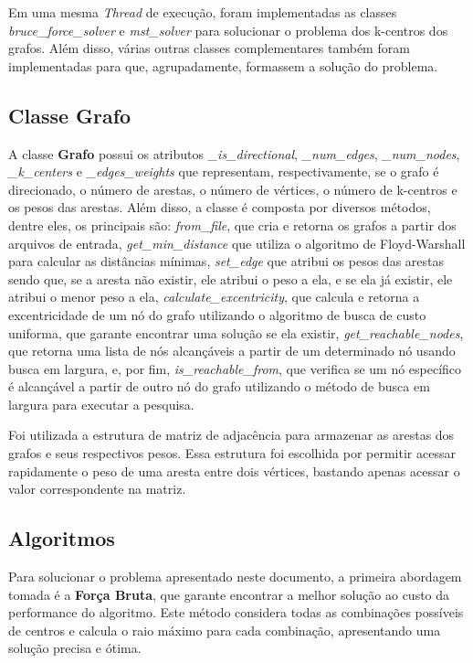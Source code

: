 Em uma mesma \textit{Thread} de execução, foram implementadas as classes \textit{bruce\_force\_solver} e \textit{mst\_solver} para solucionar o problema dos k-centros dos grafos. Além disso, várias outras classes complementares também foram implementadas para que, agrupadamente, formassem a solução do problema.  


\subsection{\esp Classe Grafo}
A classe \textbf{Grafo} possui os atributos \textit{\_is\_directional}, \textit{\_num\_edges}, \textit{\_num\_nodes}, \textit{\_k\_centers} e \textit{\_edges\_weights} que representam, respectivamente, se o grafo é direcionado, o número de arestas, o número de vértices, o número de k-centros e os pesos das arestas. Além disso, a classe é composta por diversos métodos, dentre eles, os principais são: \textit{from\_file}, que cria e retorna os grafos a partir dos arquivos de entrada, \textit{get\_min\_distance} que utiliza o algoritmo de Floyd-Warshall para calcular as distâncias mínimas, \textit{set\_edge} que atribui os pesos das arestas sendo que, se a aresta não existir, ele atribui o peso a ela, e se ela já existir, ele atribui o menor peso a ela, \textit{calculate\_excentricity}, que calcula e retorna a excentricidade de um nó do grafo utilizando o algoritmo de busca de custo uniforma, que garante encontrar uma solução se ela existir, \textit{get\_reachable\_nodes}, que retorna uma lista de nós alcançáveis a partir de um determinado nó usando busca em largura, e, por fim, \textit{is\_reachable\_from}, que verifica se um nó específico é alcançável a partir de outro nó do grafo utilizando o método de busca em largura para executar a pesquisa.

Foi utilizada a estrutura de matriz de adjacência para armazenar as arestas dos grafos e seus respectivos pesos. Essa estrutura foi escolhida por permitir acessar rapidamente o peso de uma aresta entre dois vértices, bastando apenas acessar o valor correspondente na matriz. 


\subsection{\esp Algoritmos}

Para solucionar o problema apresentado neste documento, a primeira abordagem tomada é a \textbf{Força Bruta}, que garante encontrar a melhor solução ao custo da performance do algoritmo. Este método considera todas as combinações possíveis de centros e calcula o raio máximo para cada combinação, apresentando uma solução precisa e ótima. 

